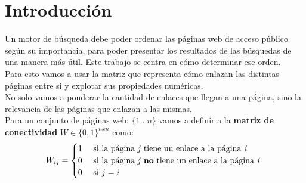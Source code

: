 \section{Introducción}





Un motor de búsqueda debe poder ordenar las páginas web de acceso público según su importancia, para poder presentar los resultados de las búsquedas de una manera más útil. Este trabajo se centra en cómo determinar ese orden. \\

Para esto vamos a usar la matriz que representa cómo enlazan las distintas páginas entre si y explotar sus propiedades numéricas. \\

No solo vamos a ponderar la cantidad de enlaces que llegan a una página, sino la relevancia de las páginas que enlazan a las mismas. \\

Para un conjunto de páginas web: $\{1 ... n\}$ vamos a definir a la \textbf{matriz de conectividad} $ W \in \{0, 1\}^{nxn} $ como: \\

\[ W_{ij} =
	\begin{cases}
		1 & \text{ si la página \textit{j} tiene un enlace a la página \textit{i} } \\
		0 & \text{ si la página \textit{j} \textbf{no} tiene un enlace a la página \textit{i} } \\
		0 & \text{ si $j = i$}
	\end{cases}
\]

